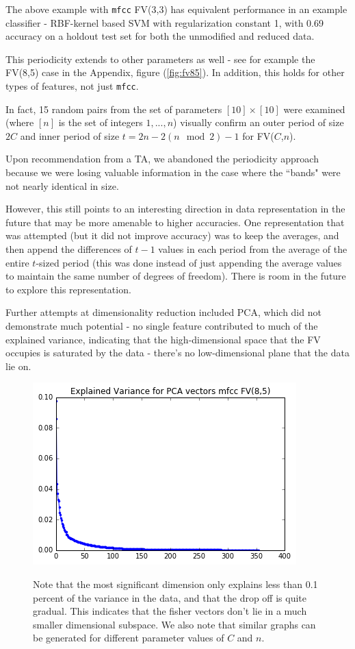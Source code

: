 \documentclass{article}
\begin{document}
The above example with \texttt{mfcc} FV(3,3) has equivalent performance in an example classifier - RBF-kernel based SVM with regularization constant 1, with 0.69 accuracy on a holdout test set for both the unmodified and reduced data.

This periodicity extends to other parameters as well - see for example the FV(8,5) case in the Appendix, figure (\ref{fig:fv85}). In addition, this holds for other types of features, not just \texttt{mfcc}.

In fact, 15 random pairs from the set of parameters $[10]\times[10]$ were examined (where $[n]$ is the set of integers $1, ..., n$) visually confirm an outer period of size $2C$ and inner period of size $t=2n-2(n\mod 2)-1$ for FV($C$,$n$).

Upon recommendation from a TA, we abandoned the periodicity approach because we were losing valuable information in the case where the ``bands" were not nearly identical in size.

However, this still points to an interesting direction in data representation in the future that may be more amenable to higher accuracies. One representation that was attempted (but it did not improve accuracy) was to keep the averages, and then append the differences of $t-1$ values in each period from the average of the entire $t$-sized period (this was done instead of just appending the average values to maintain the same number of degrees of freedom). There is room in the future to explore this representation.

Further attempts at dimensionality reduction included PCA, which did not demonstrate much potential - no single feature contributed to much of the explained variance, indicating that the high-dimensional space that the FV occupies is saturated by the data - there's no low-dimensional plane that the data lie on.

\begin{figure}[H]
    \centering
    \includegraphics[scale=0.5]{pca-mfcc8-5.png}
    \label{fig:pca}
    \caption{Note that the most significant dimension only explains less than 0.1 percent of the variance
    in the data, and that the drop off is quite gradual.
    This indicates that the fisher vectors don't lie in a much smaller dimensional subspace.
    We also note that similar graphs can be generated for different parameter values of $C$ and $n$.}
\end{figure}
\end{document}
